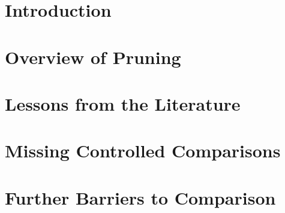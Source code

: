 \documentclass{article}  %
\begin{document}
\printAffiliationsAndNotice{\mlsysEqualContribution} %

\section{Introduction} \label{sec:intro}
\vspace{-.75mm}




\section{Overview of Pruning}

% 


\vspace{-2mm}
\section{Lessons from the Literature} \label{sec:lessons}
\vspace{-.5mm}

% 


\section{Missing Controlled Comparisons}



\section{Further Barriers to Comparison}
\end{document}

